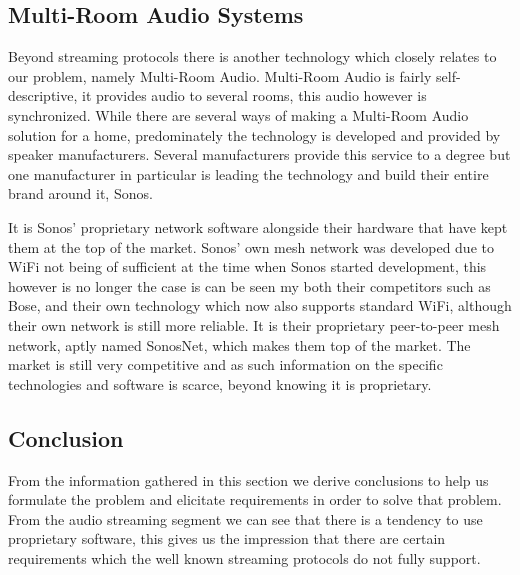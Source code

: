 \subsection{Multi-Room Audio Systems}
Beyond streaming protocols there is another technology which closely relates to our problem, namely Multi-Room Audio.
Multi-Room Audio is fairly self-descriptive, it provides audio to several rooms, this audio however is synchronized.
While there are several ways of making a Multi-Room Audio solution for a home, predominately the technology is developed and provided by speaker manufacturers.
Several manufacturers provide this service to a degree but one manufacturer in particular is leading the technology and build their entire brand around it, Sonos.

It is Sonos' proprietary network software alongside their hardware that have kept them at the top of the market.
Sonos' own mesh network was developed due to WiFi not being of sufficient at the time when Sonos started development, this however is no longer the case is can be seen my both their competitors such as Bose, and their own technology which now also supports standard WiFi, although their own network is still more reliable. %
It is their proprietary peer-to-peer mesh network, aptly named SonosNet, which makes them top of the market. %
The market is still very competitive and as such information on the specific technologies and software is scarce, beyond knowing it is proprietary.



\subsection{Conclusion}
From the information gathered in this section we derive conclusions to help us formulate the problem and elicitate requirements in order to solve that problem.
From the audio streaming segment we can see that there is a tendency to use proprietary software, this gives us the impression that there are certain requirements which the well known streaming protocols do not fully support. 

